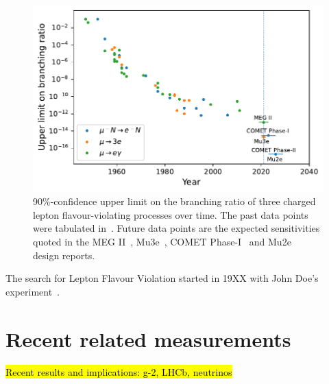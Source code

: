 \begin{figure}
    \centering
    \includegraphics{chapter1/clfv_upper_limit.pdf}
    \caption{90\%-confidence upper limit on the branching ratio of three charged lepton flavour-violating processes over time. The past data points were tabulated in~\cite{BERNSTEIN201327}. Future data points are the expected sensitivities quoted in the MEG II~\cite{Baldini2018}, Mu3e~\cite{ARNDT2021165679}, COMET Phase-I~\cite{the_comet_collaboration_comet_2020} and Mu2e~\cite{osti_1172555} design reports.}
    \label{fig:clfv_upper_limit}
\end{figure}

The search for Lepton Flavour Violation started in 19XX with John Doe's experiment~\cite{doe}.

\section{Recent related measurements}
\hl{Recent results and implications: g-2, LHCb, neutrinos}

\cite{PhysRevLett.126.141801} %

\cite{lhcbcollaboration2021test} %


%
%
%
%
